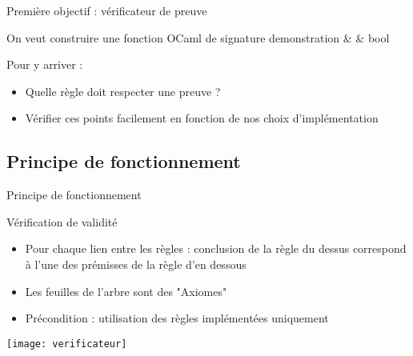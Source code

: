 \documentclass{beamer}
\begin{document}
\begin{frame}{Première objectif : vérificateur de preuve}

    On veut construire une fonction OCaml de signature demonstration {& \to &} bool


    \begin{block}{Pour y arriver : }
    \begin{itemize}
        \item Quelle règle doit respecter une preuve ?
        \item Vérifier ces points facilement en fonction de nos choix d'implémentation
    \end{itemize}
    
    \end{block}

    



\end{frame}

\subsection{Principe de fonctionnement}








\begin{frame}{Principe de fonctionnement}

    \begin{block}{Vérification de validité}
        \begin{itemize}
            \item Pour chaque lien entre les règles : conclusion de la règle du dessus correspond à l'une des prémisses de la règle d'en dessous
            \item Les feuilles de l'arbre sont des "Axiomes"
            \item Précondition : utilisation des règles implémentées uniquement
        \end{itemize}
    \end{block}

    \vspace{0.8cm}

    \begin{minipage}{1.05\textwidth}
        \centering
        \texttt{[image: verificateur]}
    \end{minipage}
    
\end{frame}
\end{document}
